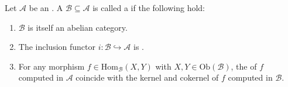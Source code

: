 
\begin{definition} \label{definition:strict_abelian_subcategory_of_an_abelian_category}
Let $\mathcal{A}$ be an . A  $\mathcal{B} \subseteq \mathcal{A}$ is called a  if the following hold:

\begin{enumerate}
    \item $\mathcal{B}$ is itself an abelian category.
    \item The inclusion functor $i: \mathcal{B} \hookrightarrow \mathcal{A}$ is .
    \item For any morphism $f \in \mathrm{Hom}_{\mathcal{B}}(X,Y)$ with $X,Y \in \mathrm{Ob}(\mathcal{B})$, the  of $f$ computed in $\mathcal{A}$ coincide with the kernel and cokernel of $f$ computed in $\mathcal{B}$.
\end{enumerate}
\end{definition}
